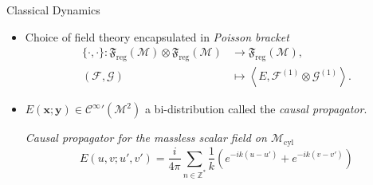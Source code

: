 \documentclass[pdf, fleqn, compress, handout]{beamer}
\newcommand{\mathsterm}[1]{{\itshape\color{dark-teal!80}#1}}
\newcommand{\ourex}[1]{{\itshape\color{viridian!70!black}#1}}
\begin{document}
\begin{frame}{Classical Dynamics}
	\begin{itemize}
		\item	Choice of field theory encapsulated in \mathsterm{Poisson bracket}
				\begin{align}
					\{\cdot, \cdot\}:
					\mathfrak{F}_\mathrm{reg}(\mathcal{M})
						\otimes
					\mathfrak{F}_\mathrm{reg}(\mathcal{M})
						&\to
					\mathfrak{F}_\mathrm{reg}(\mathcal{M}), \nonumber \\
					(\mathcal{F}, \mathcal{G})
						&\mapsto
					\left\langle 
						E,
						\mathcal{F}^{(1)}
							\otimes
						\mathcal{G}^{(1)}
					\right\rangle.
				\end{align}
		\item	$E(\mathbf{x}; \mathbf{y}) \in {\mathcal{C}^\infty}'(\mathcal{M}^2)$
				a bi-distribution called the \mathsterm{causal propagator}.	

		\vspace{1em}
				\ourex{Causal propagator for the massless scalar field on $\mathcal{M}_\mathrm{cyl}$
				\begin{equation}
					E(u, v; u', v')
						=
					\frac{i}{4 \pi}
					\sum_{n \in \mathbb{Z}^*}
						\frac{1}{k}
						\left(
							e^{-ik(u - u')} +
							e^{-ik(v - v')}
						\right)
				\end{equation}
				}
	\end{itemize}
\end{frame}

		
\end{document}
